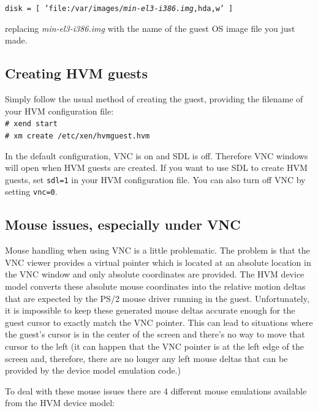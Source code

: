 \documentclass[11pt,twoside,final,openright]{report}
\begin{document}
{\small {\tt disk = [ 'file:/var/images/\emph{min-el3-i386.img},hda,w' ]}}

replacing \emph{min-el3-i386.img} with the name of the guest OS image file you just made.

\subsection{Creating HVM guests}
Simply follow the usual method of creating the guest, providing the filename of your HVM configuration file:\\

{\small {\tt \# xend start\\
\# xm create /etc/xen/hvmguest.hvm}}

In the default configuration, VNC is on and SDL is off. Therefore VNC windows will open when HVM guests are created. If you want to use SDL to create HVM guests, set {\small {\tt sdl=1}} in your HVM configuration file. You can also turn off VNC by setting {\small {\tt vnc=0}}.
 
\subsection{Mouse issues, especially under VNC}
Mouse handling when using VNC is a little problematic.
The problem is that the VNC viewer provides a virtual pointer which is
located at an absolute location in the VNC window and only absolute
coordinates are provided.
The HVM device model converts these absolute mouse coordinates
into the relative motion deltas that are expected by the PS/2
mouse driver running in the guest.
Unfortunately,
it is impossible to keep these generated mouse deltas
accurate enough for the guest cursor to exactly match
the VNC pointer.
This can lead to situations where the guest's cursor
is in the center of the screen and there's no way to
move that cursor to the left
(it can happen that the VNC pointer is at the left
edge of the screen and,
therefore,
there are no longer any left mouse deltas that
can be provided by the device model emulation code.)

To deal with these mouse issues there are 4 different
mouse emulations available from the HVM device model:
\end{document}
